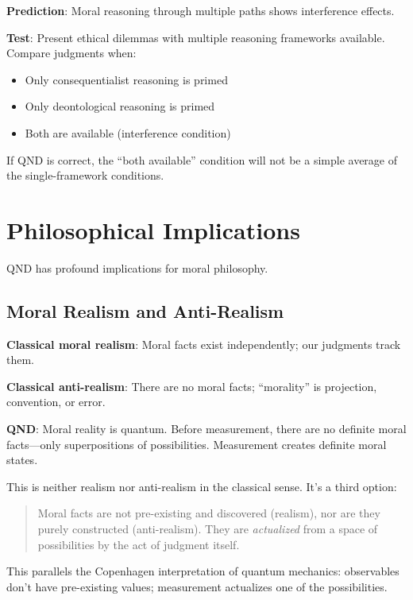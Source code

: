 \documentclass[12pt]{article}
\begin{document}
\textbf{Prediction}: Moral reasoning through multiple paths shows interference effects.

\textbf{Test}: Present ethical dilemmas with multiple reasoning frameworks available. Compare judgments when:
\begin{itemize}
    \item Only consequentialist reasoning is primed
    \item Only deontological reasoning is primed
    \item Both are available (interference condition)
\end{itemize}

If QND is correct, the ``both available'' condition will not be a simple average of the single-framework conditions.

\section{Philosophical Implications}

QND has profound implications for moral philosophy.

\subsection{Moral Realism and Anti-Realism}

\textbf{Classical moral realism}: Moral facts exist independently; our judgments track them.

\textbf{Classical anti-realism}: There are no moral facts; ``morality'' is projection, convention, or error.

\textbf{QND}: Moral reality is quantum. Before measurement, there are no definite moral facts---only superpositions of possibilities. Measurement creates definite moral states.

This is neither realism nor anti-realism in the classical sense. It's a third option:

\begin{quote}
Moral facts are not pre-existing and discovered (realism), nor are they purely constructed (anti-realism). They are \emph{actualized} from a space of possibilities by the act of judgment itself.
\end{quote}

This parallels the Copenhagen interpretation of quantum mechanics: observables don't have pre-existing values; measurement actualizes one of the possibilities.
\end{document}
